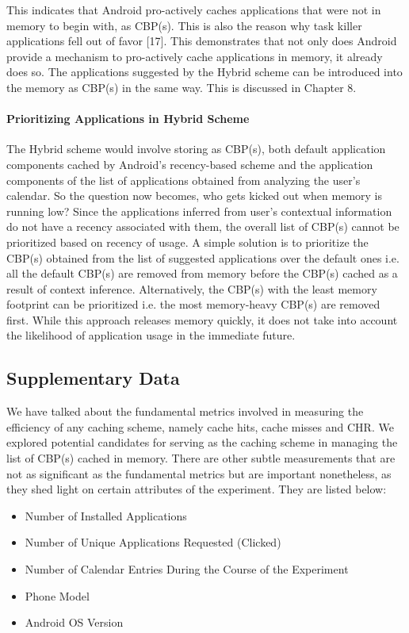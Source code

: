 \documentclass[12pt]{uthesis-v12}  %
\begin{document}
					This indicates that Android pro-actively caches applications that were not in memory to begin with, as CBP(s). This is also the reason why task killer applications fell out of favor [17]. This demonstrates that not only does Android provide a mechanism to pro-actively cache applications in memory, it already does so. The applications suggested by the Hybrid scheme can be introduced into the memory as CBP(s) in the same way. This is discussed in Chapter 8.

				\paragraph{Prioritizing Applications in Hybrid Scheme}	
					The Hybrid scheme would involve storing as CBP(s), both default application components cached by Android's recency-based scheme and the application components of the list of applications obtained from analyzing the user's calendar. So the question now becomes, who gets kicked out when memory is running low? Since the applications inferred from user's contextual information do not have a recency associated with them, the overall list of CBP(s) cannot be prioritized based on recency of usage. A simple solution is to prioritize the CBP(s) obtained from the list of suggested applications over the default ones i.e. all the default CBP(s) are removed from memory before the CBP(s) cached as a result of context inference. Alternatively, the CBP(s) with the least memory footprint can be prioritized i.e. the most memory-heavy CBP(s) are removed first. While this approach releases memory quickly, it does not take into account the likelihood of application usage in the immediate future.
					
		\subsection{Supplementary Data}
			We have talked about the fundamental metrics involved in measuring the efficiency of any caching scheme, namely cache hits, cache misses and CHR. We explored potential candidates for serving as the caching scheme in managing the list of CBP(s) cached in memory. There are other subtle measurements that are not as significant as the fundamental metrics but are important nonetheless, as they shed light on certain attributes of the experiment. They are listed below:
			
			\begin{itemize}
				\item Number of Installed Applications
				\item Number of Unique Applications Requested (Clicked)
				\item Number of Calendar Entries During the Course of the Experiment
				\item Phone Model
				\item Android OS Version
			\end{itemize} 
			
\end{document}
